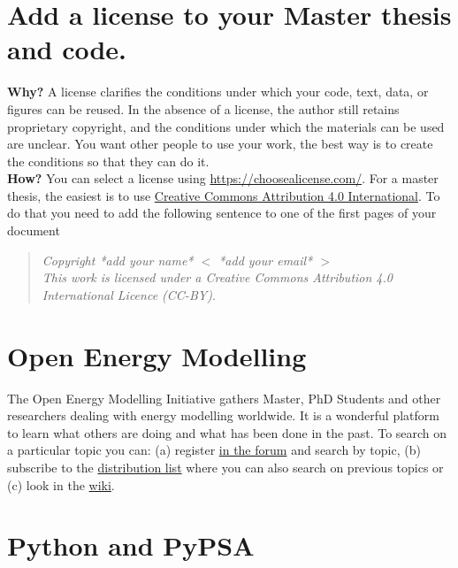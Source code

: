 \documentclass[3p]{elsarticle} %
\begin{document}
\section{Add a license to your Master thesis and code.}
 
\textbf{Why?} A license clarifies the conditions under which your code, text, data, or figures can be reused. In the absence of a license, the author still retains proprietary copyright, and the conditions under which the materials can be used are unclear. You want other people to use your work, the best way is to create the conditions so that they can do it. \\

\textbf{How?} You can select a license using \href{https://choosealicense.com/}{https://choosealicense.com/}. For a master thesis, the easiest is to use \href{https://creativecommons.org/licenses/by/4.0/}{Creative Commons Attribution 4.0 International}. To do that you need to add the following sentence to one of the first pages of your document
\begin{quote}

\textit{Copyright   *add your name* $<$ *add your email* $>$ \\
This work is licensed under a Creative Commons Attribution 4.0 International Licence (CC-BY).}

\end{quote}



\section{Open Energy Modelling}

The Open Energy Modelling Initiative gathers Master, PhD Students and other researchers dealing with energy modelling worldwide. It is a wonderful platform to learn what others are doing and what has been done in the past. To search on a particular topic you can: (a) register \href{https://forum.openmod-initiative.org/}{in the forum} and search by topic, (b) subscribe to the \href{https://groups.google.com/forum/#!forum/openmod-initiative/home}{distribution list} where you can also search on previous topics or (c) look in the \href{https://wiki.openmod-initiative.org/wiki}{wiki}. 

\section{Python and PyPSA}
\end{document}
